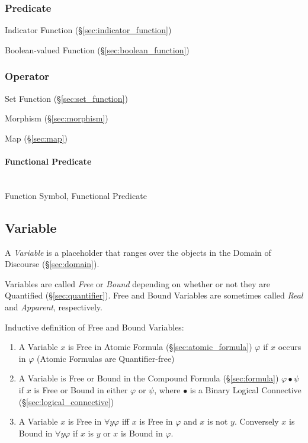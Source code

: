 \subsubsection{Predicate}\label{sec:predicate}

Indicator Function (\S\ref{sec:indicator_function})

Boolean-valued Function (\S\ref{sec:boolean_function})



\subsubsection{Operator}\label{sec:operator}

Set Function (\S\ref{sec:set_function})

Morphism (\S\ref{sec:morphism})

Map (\S\ref{sec:map})



\paragraph{Functional Predicate}\label{sec:functional_predicate}
\hfill \\

Function Symbol, Functional Predicate



\subsection{Variable}\label{sec:variable}

A \emph{Variable} is a placeholder that ranges over the objects in the
Domain of Discourse (\S\ref{sec:domain}).

Variables are called \emph{Free} or \emph{Bound} depending on whether
or not they are Quantified (\S\ref{sec:quantifier}). Free and Bound
Variables are sometimes called \emph{Real} and \emph{Apparent},
respectively.

Inductive definition of Free and Bound Variables:
\begin{enumerate}
\item A Variable $x$ is Free in Atomic Formula
  (\S\ref{sec:atomic_formula}) $\varphi$ if $x$ occurs in $\varphi$
  (Atomic Formulas are Quantifier-free)
\item A Variable is Free or Bound in the Compound Formula
  (\S\ref{sec:formula}) $\varphi \bullet \psi$ if $x$ is Free or Bound
  in either $\varphi$ or $\psi$, where $\bullet$ is a Binary Logical
  Connective (\S\ref{sec:logical_connective})
\item A Variable $x$ is Free in $\forall y \varphi$ iff $x$ is Free in
  $\varphi$ and $x$ is not $y$. Conversely $x$ is Bound in $\forall y
  \varphi$ if $x$ is $y$ or $x$ is Bound in $\varphi$.
\end{enumerate}

